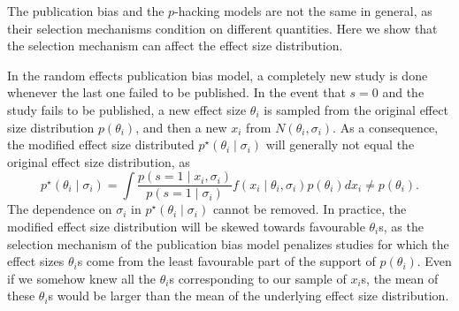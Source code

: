 \documentclass[useAMS,usenatbib,referee]{biom}
\begin{document}
The publication bias and the $p$-hacking models are not the same in general, as their selection mechanisms condition on different quantities. Here we show that the selection mechanism can affect the effect size distribution.

In the random effects publication bias model, a completely new study is done whenever the last one failed to be published. In the event that $s=0$ and the study fails to be published, a new effect size $\theta_i$ is sampled from the original effect size distribution $p(\theta_i)$, and then a new $x_i$ from $N(\theta_i,\sigma_i)$. As a consequence, the modified effect size distributed $p^\star(\theta_i\mid \sigma_i)$ will generally not equal the original effect size distribution, as
\[
p^\star(\theta_i\mid \sigma_i)=\int\frac{p(s=1\mid x_i, \sigma_i)}{p(s=1\mid\sigma_i)}f(x_i \mid \theta_i, \sigma _i) p(\theta_i) dx_i\neq p(\theta_i).
\]
The dependence on $\sigma_i$ in $p^\star(\theta_i\mid \sigma_i)$ cannot be removed. In practice, the modified effect size distribution will be skewed towards favourable $\theta_i$s, as the selection mechanism of the publication bias model penalizes studies for which the effect sizes $\theta_i$s come from the least favourable part of the support of $p(\theta_i)$. Even if we somehow knew all the $\theta_i$s corresponding to our sample of $x_i$s, the mean of these $\theta_i$s would be larger than the mean of the underlying effect size distribution. %


\end{document}
